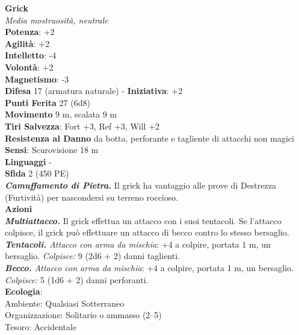 \begin{multicols}{2}
\medskip\textbf{Grick}\\
\emph{Media mostruosità, neutrale}\\
\textbf{Potenza}: +2\\
\textbf{Agilità}: +2\\
\textbf{Intelletto}: -4\\
\textbf{Volontà}: +2\\
\textbf{Magnetismo}: -3\\
\textbf{Difesa} 17 (armatura naturale) - \textbf{Iniziativa}: +2\\
\textbf{Punti Ferita} 27 (6d8)\\
\textbf{Movimento} 9 m, scalata 9 m\\
\textbf{Tiri Salvezza}: Fort +3, Ref +3, Will +2\\
\textbf{Resistenza al Danno} da botta, perforante e tagliente di attacchi non magici\\
\textbf{Sensi}: Scurovisione 18 m\\
\textbf{Linguaggi} -\\
\textbf{Sfida} 2 (450 PE)\smallskip\\
\emph{\textbf{Camuffamento di Pietra.}} Il grick ha vantaggio alle prove di Destrezza (Furtività) per nascondersi su terreno roccioso.\\
\smallskip\textbf{Azioni}\\
\emph{\textbf{Multiattacco.}} Il grick effettua un attacco con i suoi tentacoli. Se l'attacco colpisce, il grick può effettuare un attacco di becco contro lo stesso bersaglio.\\
\emph{\textbf{Tentacoli.} Attacco con arma da mischia}: +4 a colpire, portata 1 m, un bersaglio.
\emph{Colpisce:} 9 (2d6 + 2) danni taglienti.\\
\emph{\textbf{Becco.} Attacco con arma da mischia}: +4 a colpire, portata 1 m, un bersaglio.
\emph{Colpisce:} 5 (1d6 + 2) danni perforanti.\\
\textbf{Ecologia}: \\
Ambiente: Qualsiasi Sotterraneo\\
Organizzazione: Solitario o ammasso (2–5)\\
Tesoro: Accidentale\\


\end{multicols}
